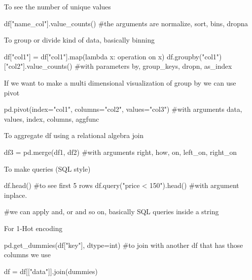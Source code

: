 To see the number of unique values

\begin{pythoncode}
    df["name_col"].value_counts() #the arguments are normalize, sort, bins, dropna
\end{pythoncode}

To group or divide kind of data, basically binning

\begin{pythoncode}
    df["col1"] = df["col1"].map(lambda x: operation on x)
    df.groupby("col1") ["col2"].value_counts() #with parameters by, group_keys, dropn, as_index
\end{pythoncode}

If we want to make a multi dimensional visualization of group by we can use pivot

\begin{pythoncode}
    

pd.pivot(index="col1", columns="col2", values="col3") #with arguments data, values, index, columns, aggfunc

\end{pythoncode}

To aggregate df using a relational algebra join

\begin{pythoncode}
    df3 = pd.merge(df1, df2) #with arguments right, how, on, left_on, right_on
\end{pythoncode}

To make queries (SQL style)

\begin{pythoncode}
    df.head() #to see first 5 rows
    df.query("price < 150").head() #with argument inplace. 

    #we can apply and, or and so on, basically SQL queries inside a string
\end{pythoncode}

For 1-Hot encoding

\begin{pythoncode}
    pd.get_dummies(df["key"], dtype=int) #to join with another df that has those columns we use

    df = df[["data"]].join(dummies)
\end{pythoncode}
